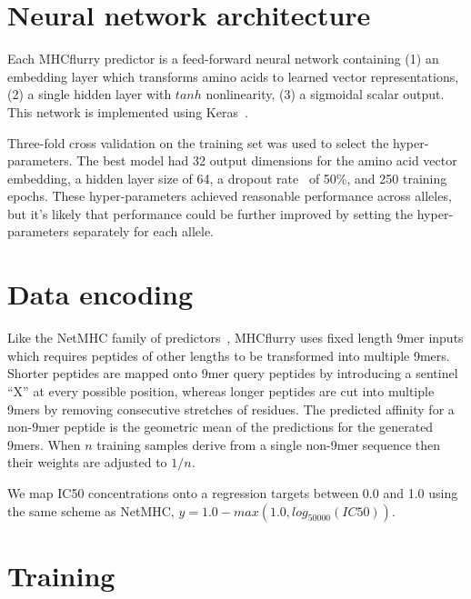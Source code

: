 \section{Neural network architecture}
Each MHCflurry predictor is a feed-forward neural network containing (1) an embedding layer which transforms amino acids to learned vector representations, (2) a single hidden layer with $tanh$ nonlinearity, (3) a sigmoidal scalar output. This network is implemented using Keras~\cite{chollet2015}.  


Three-fold cross validation on the training set was used to select the hyper-parameters. The best model had 32 output dimensions for the amino acid vector embedding, a hidden layer size of 64, a dropout rate~\cite{Srivastava2014} of 50\%, and 250 training epochs. These hyper-parameters achieved reasonable performance across alleles, but it's likely that performance could be further improved by setting the hyper-parameters separately for each allele.

\section{Data encoding}

Like the NetMHC family of predictors~\cite{lundegaard2008accurate}, MHCflurry uses fixed length 9mer inputs which requires peptides of other lengths to be transformed into multiple 9mers. Shorter peptides are mapped onto 9mer query peptides by introducing a sentinel ``X'' at every possible position, whereas longer peptides are cut into multiple 9mers by removing consecutive stretches of residues. The predicted affinity for a non-9mer peptide is the geometric mean of the predictions for the generated 9mers. When $n$ training samples derive from a single non-9mer sequence then their weights are adjusted to $1/n$. 

We map IC50 concentrations onto a regression targets between 0.0 and 1.0 using the same scheme as NetMHC, $y = 1.0 - max(1.0, log_{50000}(IC50))$.

\section{Training}

